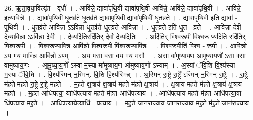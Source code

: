 \documentclass[17pt]{extarticle}
\begin{document}
26. ऋ॒ता॒वृधा॒वित्यृ॑त - वृधौ᳚ । . आवि॑न्ने॒ द्यावा॑पृथि॒वी द्यावा॑पृथि॒वी आवि॑न्ने॒ आवि॑न्ने॒ द्यावा॑पृथि॒वी । . आवि॑न्ने॒ इत्यावि॑न्ने । . द्यावा॑पृथि॒वी धृ॒तव्र॑ते धृ॒तव्र॑ते॒ द्यावा॑पृथि॒वी द्यावा॑पृथि॒वी धृ॒तव्र॑ते । . द्यावा॑पृथि॒वी इति॒ द्यावा᳚ - पृ॒थि॒वी । . धृ॒तव्र॑ते॒ आवि॒न्ना ऽऽवि॑न्ना धृ॒तव्र॑ते धृ॒तव्र॑ते॒ आवि॑न्ना । . धृ॒तव्र॑ते॒ इति॑ धृ॒त - व्र॒ते॒ । . आवि॑न्ना दे॒वी दे॒व्यावि॒न्ना ऽऽवि॑न्ना दे॒वी । . दे॒व्यदि॑ति॒रदि॑तिर् दे॒वी दे॒व्यदि॑तिः । . अदि॑तिर् विश्वरू॒पी वि॑श्वरू॒ प्यदि॑ति॒ रदि॑तिर् विश्वरू॒पी । . वि॒श्व॒रू॒प्यावि॑न्न॒ आवि॑न्नो विश्वरू॒पी वि॑श्वरू॒प्यावि॑न्नः । . वि॒श्व॒रू॒पीति॑ विश्व - रू॒पी । . आवि॑न्नो॒ ऽय म॒य मावि॑न्न॒ आवि॑न्नो॒ ऽयम् । . अ॒य म॒सा व॒सा व॒य म॒य म॒सौ । . अ॒सा वा॑मुष्याय॒ण आ॑मुष्याय॒णो॑ ऽसा व॒सा वा॑मुष्याय॒णः । . आ॒मु॒ष्या॒य॒णो᳚ ऽस्या म॒स्या मा॑मुष्याय॒ण आ॑मुष्याय॒णो᳚ ऽस्याम् । . अ॒स्यां ॅवि॒शि वि॒श्य॑स्या म॒स्यां ॅवि॒शि । . वि॒श्य॑स्मिन् न॒स्मिन्. वि॒शि वि॒श्य॑स्मिन्न् । . अ॒स्मिन् रा॒ष्ट्रे रा॒ष्ट्रे᳚ ऽस्मिन् न॒स्मिन् रा॒ष्ट्रे । . रा॒ष्ट्रे म॑ह॒ते म॑ह॒ते रा॒ष्ट्रे रा॒ष्ट्रे म॑ह॒ते । . म॒ह॒ते क्ष॒त्राय॑ क्ष॒त्राय॑ मह॒ते म॑ह॒ते क्ष॒त्राय॑ । . क्ष॒त्राय॑ मह॒ते म॑ह॒ते क्ष॒त्राय॑ क्ष॒त्राय॑ मह॒ते । . म॒ह॒त आधि॑पत्या॒ याधि॑पत्याय मह॒ते म॑ह॒त आधि॑पत्याय । . आधि॑पत्याय मह॒ते म॑ह॒त आधि॑पत्या॒या धि॑पत्याय मह॒ते । . आधि॑पत्या॒येत्याधि॑ - प॒त्या॒य॒ । . म॒ह॒ते जान॑राज्याय॒ जान॑राज्याय मह॒ते म॑ह॒ते जान॑राज्याय । \newline
\end{document}
